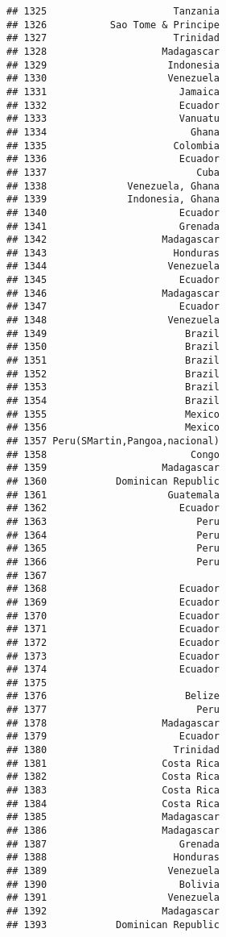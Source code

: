 \documentclass[
]{article}
\begin{document}
\begin{verbatim}
## 1325                      Tanzania
## 1326           Sao Tome & Principe
## 1327                      Trinidad
## 1328                    Madagascar
## 1329                     Indonesia
## 1330                     Venezuela
## 1331                       Jamaica
## 1332                       Ecuador
## 1333                       Vanuatu
## 1334                         Ghana
## 1335                      Colombia
## 1336                       Ecuador
## 1337                          Cuba
## 1338              Venezuela, Ghana
## 1339              Indonesia, Ghana
## 1340                       Ecuador
## 1341                       Grenada
## 1342                    Madagascar
## 1343                      Honduras
## 1344                     Venezuela
## 1345                       Ecuador
## 1346                    Madagascar
## 1347                       Ecuador
## 1348                     Venezuela
## 1349                        Brazil
## 1350                        Brazil
## 1351                        Brazil
## 1352                        Brazil
## 1353                        Brazil
## 1354                        Brazil
## 1355                        Mexico
## 1356                        Mexico
## 1357 Peru(SMartin,Pangoa,nacional)
## 1358                         Congo
## 1359                    Madagascar
## 1360            Dominican Republic
## 1361                     Guatemala
## 1362                       Ecuador
## 1363                          Peru
## 1364                          Peru
## 1365                          Peru
## 1366                          Peru
## 1367                              
## 1368                       Ecuador
## 1369                       Ecuador
## 1370                       Ecuador
## 1371                       Ecuador
## 1372                       Ecuador
## 1373                       Ecuador
## 1374                       Ecuador
## 1375                              
## 1376                        Belize
## 1377                          Peru
## 1378                    Madagascar
## 1379                       Ecuador
## 1380                      Trinidad
## 1381                    Costa Rica
## 1382                    Costa Rica
## 1383                    Costa Rica
## 1384                    Costa Rica
## 1385                    Madagascar
## 1386                    Madagascar
## 1387                       Grenada
## 1388                      Honduras
## 1389                     Venezuela
## 1390                       Bolivia
## 1391                     Venezuela
## 1392                    Madagascar
## 1393            Dominican Republic

\end{verbatim}
\end{document}
